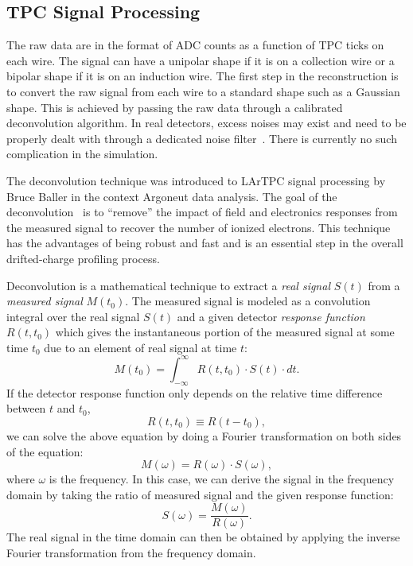 \subsection{TPC Signal Processing}
The raw data are in the format of ADC counts as a function of TPC ticks on each wire. The signal can have a unipolar shape if it is on a collection wire or a bipolar shape if it is on an induction wire. The first step in the reconstruction is to convert the raw signal from each wire to a standard shape such as a Gaussian shape. This is achieved by passing the raw data through a calibrated deconvolution algorithm. In real detectors, excess noises may exist and need to be properly dealt with through a dedicated noise filter~\cite{Acciarri:2017sde}. There is currently no such complication in the simulation.

The deconvolution technique was introduced to LArTPC signal processing by 
Bruce Baller in the context Argoneut data analysis. The goal of 
the deconvolution~\cite{Baller:2017ugz} is to ``remove'' the impact of field and electronics responses from the 
measured signal to recover the number of ionized electrons. This technique has 
the advantages of being robust and fast and is an essential step in the overall
drifted-charge profiling process. 

Deconvolution is a mathematical technique to extract a \textit{real signal}
$S(t)$ from a \textit{measured signal} $M(t_0)$.  The measured signal is
modeled as a convolution integral over the real signal $S(t)$ and a
given detector \textit{response function} $R(t,t_0)$ which gives the
instantaneous portion of the measured signal at some time $t_0$ due to
an element of real signal at time $t$:
\begin{equation}\label{eq:decon_1}
M(t_0) = \int_{-\infty}^{\infty}  R(t,t_0) \cdot S(t) \cdot dt.
\end{equation}
If the detector response function only depends on the relative time 
difference between $t$ and $t_0$,
\begin{equation}
R(t,t_0) \equiv R(t-t_0),
\end{equation}
 we can solve the above equation by 
doing a Fourier transformation on both sides of the equation:
\begin{equation}
M(\omega) = R(\omega) \cdot S(\omega), 
\end{equation}
where $\omega$ is the frequency. In this case, we can derive the signal in the 
frequency domain by taking the ratio of measured signal and the given
response function:
\begin{equation}\label{eq:decon_2}
S(\omega) = \frac{M(\omega)}{R(\omega)}.
\end{equation}
The real signal in the time domain can then be obtained by applying the inverse Fourier 
transformation from the frequency domain. 

